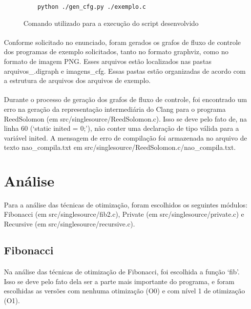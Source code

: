 \documentclass[12pt]{article}
\begin{document}
\begin{figure}
    \centering
    \begin{verbatim}
    python ./gen_cfg.py ./exemplo.c
\end{verbatim}
    \caption{Comando utilizado para a execução do script desenvolvido}
\end{figure}

\paragraph{}Conforme solicitado no enunciado, foram gerados os grafos de fluxo de controle dos programas de exemplo solicitados, tanto no formato graphviz, como no formato de imagem PNG. Esses arquivos estão localizados nas pastas arquivos\_.digraph e imagens\_cfg. Essas pastas estão organizadas de acordo com a estrutura de arquivos dos arquivos de exemplo.

\paragraph{}Durante o processo de geração dos grafos de fluxo de controle, foi encontrado um erro na geração da representação intermediária do Clang para o programa ReedSolomon (em src/singlesource/ReedSolomon.c). Isso se deve pelo fato de, na linha 60 (‘static inited = 0;’), não conter uma declaração de tipo válida para a variável inited. A mensagem de erro de compilação foi armazenada no arquivo de texto nao\_compila.txt em src/singlesource/ReedSolomon.c/nao\_compila.txt.

\section{Análise}

\paragraph{}Para a análise das técnicas de otimização, foram escolhidos os seguintes módulos: Fibonacci (em src/singlesource/fib2.c), Private (em src/singlesource/private.c) e Recursive (em src/singlesource/recursive.c).

\subsection{Fibonacci}

\paragraph{}Na análise das técnicas de otimização de Fibonacci, foi escolhida a função ‘fib’. Isso se deve pelo fato dela ser a parte mais importante do programa, e foram escolhidas as versões com nenhuma otimização (O0) e com nível 1 de otimização (O1).
\end{document}

